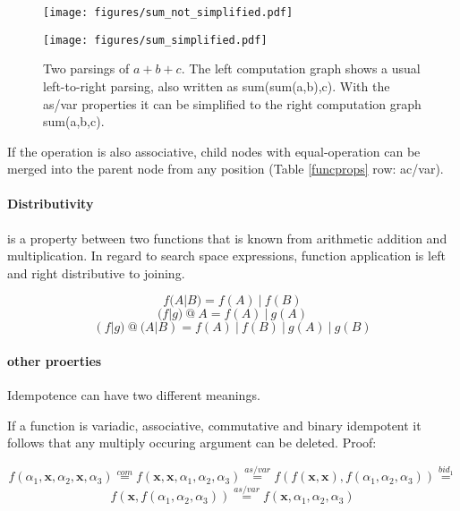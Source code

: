 \documentclass[english]{article}
\begin{document}
\begin{figure}

\begin{minipage}[b]{0.35\textwidth}
\caption{Two parsings of $a+b+c$. The left computation graph shows a usual left-to-right parsing, also written as sum(sum(a,b),c). With the as/var properties it can be simplified to the right computation graph sum(a,b,c).}
\label{as/var transform}
\end{minipage}%
\hfill%
\begin{minipage}[b]{0.3\textwidth}
\centering
\texttt{[image: figures/sum\_not\_simplified.pdf]}

\end{minipage}%
\hfill%
\begin{minipage}[b]{0.3\textwidth}
\centering
\texttt{[image: figures/sum\_simplified.pdf]}
\end{minipage}%
\end{figure}

If the operation is also associative, child nodes with equal-operation can be merged into the parent node from any position (Table \ref{funcprops} row: ac/var).

\paragraph{Distributivity} is a property between two functions that is known from arithmetic addition and multiplication. In regard to search space expressions, function application is left and right distributive to joining.

$$f(A|B) = f(A)\ |\ f(B)$$
$$(f|g)\ @\ A = f(A)\ |\ g(A)$$
$$(f|g)\ @\ (A|B) = f(A)\ |\ f(B)\ |\ g(A)\ |\ g(B)$$

\paragraph{other proerties}
Idempotence can have two different meanings.

If a function is variadic, associative, commutative and binary idempotent it follows that any multiply occuring argument can be deleted. Proof:

$$f(\alpha_1, \mathbf{x}, \alpha_2, \mathbf{x}, \alpha_3) \stackrel{com}{=}
f(\mathbf{x},\mathbf{x}, \alpha_1, \alpha_2, \alpha_3) \stackrel{as/var}{=}
f(f(\mathbf{x},\mathbf{x}), f(\alpha_1, \alpha_2, \alpha_3)) \stackrel{bid_1}{=}$$
$$f(\mathbf{x}, f(\alpha_1, \alpha_2, \alpha_3)) \stackrel{as/var}{=}
f(\mathbf{x}, \alpha_1, \alpha_2, \alpha_3)$$
\end{document}
